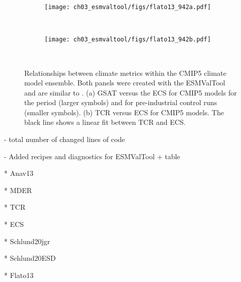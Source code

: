 \begin{figure}[t]
  \centering
  \begin{subfigure}[t]{0.34\columnwidth}
    \texttt{[image: ch03\_esmvaltool/figs/flato13\_942a.pdf]}
    \caption{}
    \label{fig:03:flato13:a}
  \end{subfigure}
  ~
  \begin{subfigure}[t]{0.34\columnwidth}
    \texttt{[image: ch03\_esmvaltool/figs/flato13\_942b.pdf]}
    \caption{}
    \label{fig:03:flato13:b}
  \end{subfigure}
  ~
  \begin{subfigure}[t]{0.24\columnwidth}
  \end{subfigure}
  \caption{Relationships between climate metrics within the \acs{CMIP}5 climate
    model ensemble. Both panels were created with the \acs{ESMValTool} and are
    similar to \textcite{Flato2013}. (a) \Acf{GSAT} versus the \acf{ECS} for
    \acs{CMIP}5 models for the period  (larger symbols) and
    for pre-industrial control runs (smaller symbols). (b) \acf{TCR} versus
    \acs{ECS} for \acs{CMIP}5 models. The black line shows a linear fit
    between \acs{TCR} and \acs{ECS}.}
\end{figure}

- total number of changed lines of code

- Added recipes and diagnostics for ESMValTool + table

* Anav13

* MDER

* TCR

* ECS

* Schlund20jgr

* Schlund20ESD

* Flato13
